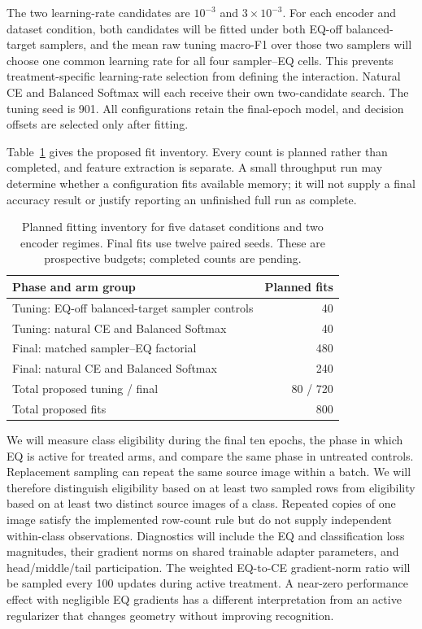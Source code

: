 \documentclass[conference]{IEEEtran}
\begin{document}
The two learning-rate candidates are $10^{-3}$ and $3\times10^{-3}$. For each encoder and dataset condition, both candidates will be fitted under both EQ-off balanced-target samplers, and the mean raw tuning macro-F1 over those two samplers will choose one common learning rate for all four sampler--EQ cells. This prevents treatment-specific learning-rate selection from defining the interaction. Natural CE and Balanced Softmax will each receive their own two-candidate search. The tuning seed is 901. All configurations retain the final-epoch model, and decision offsets are selected only after fitting.

Table~\ref{tab:budget} gives the proposed fit inventory. Every count is planned rather than completed, and feature extraction is separate. A small throughput run may determine whether a configuration fits available memory; it will not supply a final accuracy result or justify reporting an unfinished full run as complete.

\begin{table}[t]
\centering\footnotesize
\caption{Planned fitting inventory for five dataset conditions and two encoder regimes. Final fits use twelve paired seeds. These are prospective budgets; completed counts are pending.}
\label{tab:budget}
\begin{tabularx}{\linewidth}{@{}Xr@{}}
\toprule
Phase and arm group & Planned fits\\
\midrule
Tuning: EQ-off balanced-target sampler controls & 40\\
Tuning: natural CE and Balanced Softmax & 40\\
Final: matched sampler--EQ factorial & 480\\
Final: natural CE and Balanced Softmax & 240\\
\midrule
Total proposed tuning / final & 80 / 720\\
Total proposed fits & 800\\
\bottomrule
\end{tabularx}
\end{table}

We will measure class eligibility during the final ten epochs, the phase in which EQ is active for treated arms, and compare the same phase in untreated controls. Replacement sampling can repeat the same source image within a batch. We will therefore distinguish eligibility based on at least two sampled rows from eligibility based on at least two distinct source images of a class. Repeated copies of one image satisfy the implemented row-count rule but do not supply independent within-class observations. Diagnostics will include the EQ and classification loss magnitudes, their gradient norms on shared trainable adapter parameters, and head/middle/tail participation. The weighted EQ-to-CE gradient-norm ratio will be sampled every 100 updates during active treatment. A near-zero performance effect with negligible EQ gradients has a different interpretation from an active regularizer that changes geometry without improving recognition.
\end{document}
